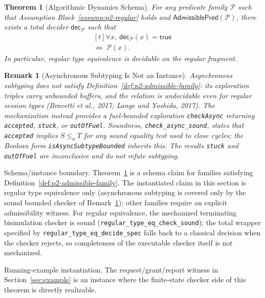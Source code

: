 \documentclass[a4paper,10pt,twocolumn,english]{article}
\numberwithin{equation}{section}
\theoremstyle{paperdef}
\theoremstyle{paperplain}
\newtheorem{theorem}[definition]{Theorem}
\theoremstyle{paperdef}
\theoremstyle{paperremark}
\newtheorem{remark}[definition]{Remark}
\begin{document}
\begin{theorem}[Algorithmic Dynamics Schema]
	\label{thm:algorithmic}
	For any predicate family $\mathcal{P}$ such that
	Assumption Block~\ref{assump:p2-regular} holds and
	$\mathsf{AdmissiblePred}(\mathcal{P})$, there exists a total decider
	$\mathsf{dec}_{\mathcal{P}}$ such that
	\begin{equation}
		\begin{aligned}[t]
			\forall x,\ \mathsf{dec}_{\mathcal{P}}(x) = \mathsf{true}
			\\
			\iff\ \mathcal{P}(x).
		\end{aligned}
	\end{equation}
	In particular, regular type equivalence is decidable on the regular fragment.
\end{theorem}

\begin{remark}[Asynchronous Subtyping Is Not an Instance]
	\label{rem:p2-async}
	Asynchronous subtyping does not satisfy Definition~\ref{def:p2-admissible-family}: its
	exploration triples carry unbounded buffers, and the relation is undecidable even for regular
	session types (Bravetti et al., 2017; Lange and Yoshida, 2017). The mechanization instead provides
	a fuel-bounded exploration \texttt{checkAsync} returning \texttt{accepted}, \texttt{stuck}, or
	\texttt{outOfFuel}. Soundness, \nolinkurl{check_async_sound}, states that
	\texttt{accepted} implies $S \le_a T$ for any sound equality test used to close cycles; the
	Boolean form \texttt{isAsyncSubtypeBounded} inherits this. The results \texttt{stuck} and
	\texttt{outOfFuel} are inconclusive and do not refute subtyping.
\end{remark}

Schema/instance boundary. Theorem~\ref{thm:algorithmic} is a schema claim for
families satisfying Definition~\ref{def:p2-admissible-family}. The instantiated
claim in this section is regular type equivalence only (asynchronous subtyping
is covered only by the sound bounded checker of
Remark~\ref{rem:p2-async}); other families require an explicit admissibility
witness. For regular equivalence, the mechanized terminating bisimulation
checker is sound (\nolinkurl{regular_type_eq_check_sound}); the total wrapper
specified by \nolinkurl{regular_type_eq_decide_spec} falls back to a classical
decision when the checker rejects, so completeness of the executable checker
itself is not mechanized.

Running-example instantiation. The request/grant/report witness in
Section~\ref{sec:example} is an instance where the finite-state checker side of
this theorem is directly realizable.
\end{document}
